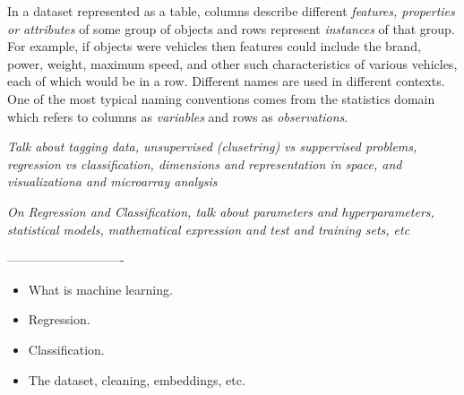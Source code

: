 In a dataset represented as a table, columns describe different \emph{features, properties or attributes} of some group of objects and rows represent \emph{instances} of that group. For example, if objects were vehicles then features could include the brand, power, weight, max\-imum speed, and other such characteristics of various vehicles, each of which would be in a row. Different names are used in different contexts. One of the most typical naming conventions comes from the statistics domain which refers to columns as \emph{variables} and rows as \emph{observations}.

\begin{table}[h]
    \caption{Example extracted from the Internet Firewall Data dataset (\cite{ertam_internet_2019}). Only five observations and main variables shown. }
    \label{tab:example_dataset}
\end{table}

\emph{Talk about tagging data, unsupervised (clusetring) vs suppervised problems, regression vs classification, dimensions and representation in space, and visualizationa and microarray analysis}

\emph{On Regression and Classification, talk about parameters and hyperparameters, statistical models, mathematical expression and test and training sets, etc}

----------------------------

\begin{itemize}
    \item What is machine learning.
    \item Regression.
    \item Classification.
    \item The dataset, cleaning, embeddings, etc.
\end{itemize}

